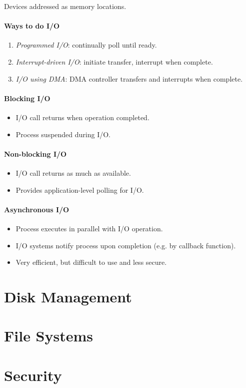 \documentclass[twocolumn,english]{article}
\begin{document}
Devices addressed as memory locations.

\paragraph{Ways to do I/O}
\begin{enumerate}
\item \emph{Programmed I/O}: continually poll until ready.
\item \emph{Interrupt-driven I/O}: initiate transfer, interrupt when complete.
\item \emph{I/O using DMA}: DMA controller transfers and interrupts when
complete.
\end{enumerate}

\paragraph{Blocking I/O}
\begin{itemize}
\item I/O call returns when operation completed.
\item Process suspended during I/O.
\end{itemize}

\paragraph{Non-blocking I/O}
\begin{itemize}
\item I/O call returns as much as available.
\item Provides application-level polling for I/O.
\end{itemize}

\paragraph{Asynchronous I/O}
\begin{itemize}
\item Process executes in parallel with I/O operation.
\item I/O systems notify process upon completion (e.g. by callback function).
\item Very efficient, but difficult to use and less secure.
\end{itemize}

\section{Disk Management}

\section{File Systems}

\section{Security}
\end{document}
